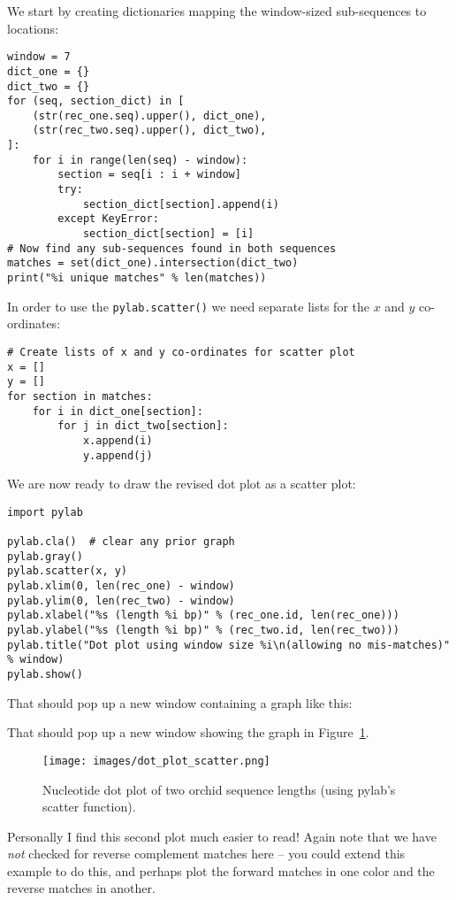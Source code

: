 We start by creating dictionaries mapping the window-sized sub-sequences to locations:
\begin{verbatim}
window = 7
dict_one = {}
dict_two = {}
for (seq, section_dict) in [
    (str(rec_one.seq).upper(), dict_one),
    (str(rec_two.seq).upper(), dict_two),
]:
    for i in range(len(seq) - window):
        section = seq[i : i + window]
        try:
            section_dict[section].append(i)
        except KeyError:
            section_dict[section] = [i]
# Now find any sub-sequences found in both sequences
matches = set(dict_one).intersection(dict_two)
print("%i unique matches" % len(matches))
\end{verbatim}
\noindent In order to use the \verb|pylab.scatter()| we need separate lists for the $x$ and $y$ co-ordinates:
\begin{verbatim}
# Create lists of x and y co-ordinates for scatter plot
x = []
y = []
for section in matches:
    for i in dict_one[section]:
        for j in dict_two[section]:
            x.append(i)
            y.append(j)
\end{verbatim}
\noindent We are now ready to draw the revised dot plot as a scatter plot:
\begin{verbatim}
import pylab

pylab.cla()  # clear any prior graph
pylab.gray()
pylab.scatter(x, y)
pylab.xlim(0, len(rec_one) - window)
pylab.ylim(0, len(rec_two) - window)
pylab.xlabel("%s (length %i bp)" % (rec_one.id, len(rec_one)))
pylab.ylabel("%s (length %i bp)" % (rec_two.id, len(rec_two)))
pylab.title("Dot plot using window size %i\n(allowing no mis-matches)" % window)
pylab.show()
\end{verbatim}
%
%
\begin{htmlonly}
\noindent That should pop up a new window containing a graph like this:


\end{htmlonly}
\begin{latexonly}
\noindent That should pop up a new window showing the graph in Figure~\ref{fig:nuc-dot-plot-scatter}.
\begin{figure}[htbp]
\centering
\texttt{[image: images/dot\_plot\_scatter.png]}
\caption{Nucleotide dot plot of two orchid sequence lengths (using pylab's scatter function).}
\label{fig:nuc-dot-plot-scatter}
\end{figure}\end{latexonly}
Personally I find this second plot much easier to read!
Again note that we have \emph{not} checked for reverse complement matches here
-- you could extend this example to do this, and perhaps plot the forward
matches in one color and the reverse matches in another.

